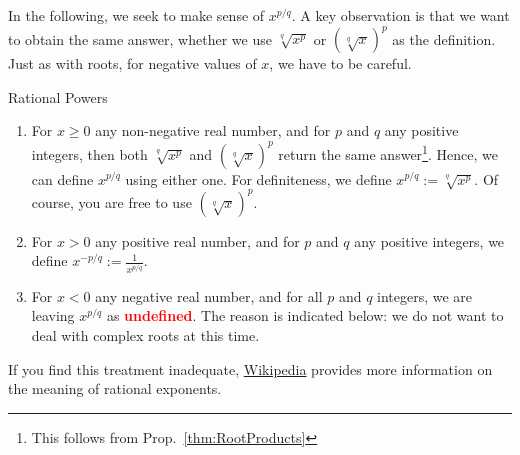 In the following, we seek to make sense of $x^{p/q}$. A key observation is that we want to obtain the same answer, whether we use $\sqrt[q]{x^p}$ or $\left( \sqrt[q]{x} \right)^p$ as the definition. Just as with roots, for negative values of $x$, we have to be careful.
\bigskip

\begin{tcolorbox}[colback=mylightblue, title = {Defining Rational Exponents (Powers) in a Careful Manner}, breakable]

\begin{definition} Rational Powers %

\begin{enumerate}   
\renewcommand{\labelenumi}{(\alph{enumi})}
\setlength{\itemsep}{.2cm}
\item For $x\ge 0$ any non-negative real number, and for $p$ and $q$ any positive integers, then both $\sqrt[q]{x^p}$ and $\left(\sqrt[q]{x}\right)^p$ return the same answer\footnote{This follows from Prop.~\ref{thm:RootProducts}}. Hence, we can define $x^{p/q}$ using either one. For definiteness, we define $x^{p/q} := \sqrt[q]{x^p}$. Of course, you are free to use $\left(\sqrt[q]{x}\right)^p$.

\item For $x>0$ any positive real number, and for $p$ and $q$ any positive integers, we define $x^{-p/q} := \frac{1}{x^{p/q}}$. 

\item  For $x< 0$ any negative real number, and for all $p$ and $q$ integers, we are leaving $x^{p/q}$ as \textcolor{red}{\bf undefined}. The reason is indicated below: we do not want to deal with complex roots at this time.  
 
\end{enumerate}
If you find this treatment inadequate, \href{https://en.wikipedia.org/wiki/Exponentiation}{Wikipedia} provides more information on the meaning of rational exponents.
\end{definition}

\bigskip

\end{tcolorbox}


